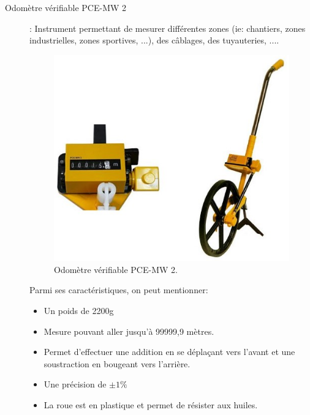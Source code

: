\documentclass[a4paper, 12pt]{book}
\begin{document}
\begin{description}
	\item[Odomètre vérifiable PCE-MW 2]: Instrument permettant de mesurer différentes zones (ie: chantiers, zones industrielles, zones sportives, ...), des câblages, des tuyauteries, ....
\begin{figure}[H]
 	\begin{center}
 		\hspace{2cm}
		\includegraphics[scale=0.5]{images/instrument2.jpg} \hspace{2cm}
		\caption{Odomètre vérifiable PCE-MW 2.\label{fig-instrument2}}
  	\end{center}
\end{figure}
Parmi ses caractéristiques, on peut mentionner:
	\begin{itemize}
		\item Un poids de 2200g
		\item Mesure pouvant aller jusqu'à 99999,9 mètres.
		\item Permet d'effectuer une addition en se déplaçant vers l'avant et une soustraction en bougeant vers l'arrière.
		\item Une précision de $\pm 1\%$
		\item La roue est en plastique et permet de résister aux huiles.
	\end{itemize}	
\end{description}
\end{document}

